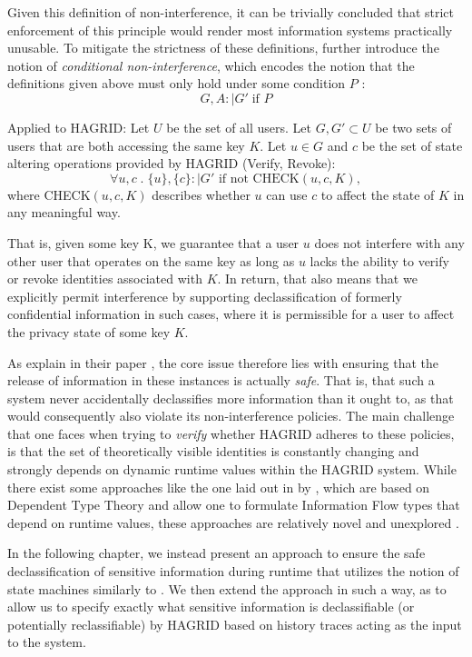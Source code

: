 Given this definition of non-interference, it can be trivially concluded that strict enforcement of this principle would render most information systems practically unusable.
To mitigate the strictness of these definitions, \citeauthor{Goguen_Meseguer_82} further introduce the notion of \emph{conditional non-interference}, which encodes the notion that the definitions given above must only hold under some condition \(P\) \cite{Goguen_Meseguer_82}: \[
     G,A :\mid G' \; \text{if } P 
\]

Applied to HAGRID: Let \(U\) be the set of all users. Let \(G,G' \subset U\) be two sets of users that are both accessing the same key \(K\). Let \(u \in G\) and \(c\) be the set of state altering operations provided by HAGRID (Verify, Revoke): 
\[
    \forall u,c \;.\; \{u\}, \{c\} :\mid G' \text{ if not } \text{CHECK}(u,c,K),
\]
where CHECK\((u,c,K)\) describes whether \(u\) can use \(c\) to affect the state of \(K\) in any meaningful way.

That is, given some key K, we guarantee that a user \(u\) does not interfere with any other user that operates on the same key as long as \(u\) lacks the ability to verify or revoke identities associated with \(K\). 
In return, that also means that we explicitly permit interference by supporting declassification of formerly confidential information in such cases, where it is permissible for a user to affect the privacy state of some key \(K\).

As \citeauthor{declass_dim_prin} explain in their paper , the core issue therefore lies with ensuring that the release of information in these instances is actually \emph{safe}\cite{declass_dim_prin}. That is, that such a system never accidentally declassifies more information than it ought to, as that would consequently also violate its non-interference policies.
The main challenge that one faces when trying to \emph{verify} whether HAGRID adheres to these policies, is that the set of theoretically visible identities is constantly changing and strongly depends on dynamic runtime values within the HAGRID system. 
While there exist some approaches like the one laid out in  by \citeauthor{Lourenco_Caires_15}, which are based on Dependent Type Theory and allow one to formulate Information Flow types that depend on runtime values, these approaches are relatively novel and unexplored \cite{Lourenco_Caires_15}.

In the following chapter, we instead present an approach to ensure the safe declassification of sensitive information during runtime that utilizes the notion of state machines similarly to \citeauthor{Goguen_Meseguer_82}. We then extend the approach in such a way, as to allow us to specify exactly what sensitive information is declassifiable (or potentially reclassifiable) by HAGRID based on history traces acting as the input to the system.

